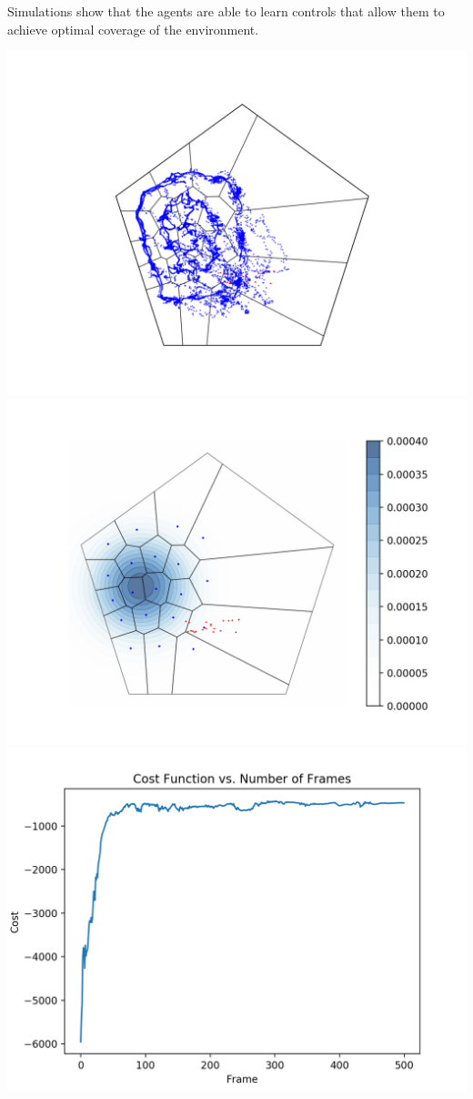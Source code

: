 \documentclass[10pt,conference]{IEEEtran}
\begin{document}
Simulations show that the agents are able to learn controls that allow them to achieve optimal coverage of the environment.
\begin{center}
	\includegraphics[scale=.2]{poster_sim1_tracking}
	\includegraphics[scale=.2]{poster_sim1_final}
	\includegraphics[scale=.2]{poster_sim1_cost_}

\end{center}
\end{document}
